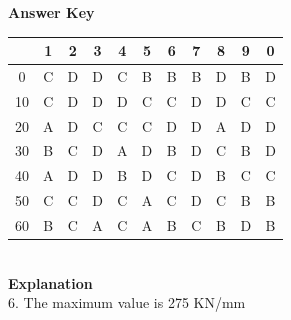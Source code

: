 \documentclass[11pt,a4paper]{article}
\begin{document}
\textbf{Answer Key}
\begin{tabular}{ | c | c c c c c c c c c c | }
\hline
 & 1 & 2 & 3 & 4 & 5 & 6 & 7 & 8 & 9 & 0 \\
\hline
0 & C & D & D & C & B & B & B & D & B & D \\
10 & C & D & D & D & C & C & D & D & C & C \\
20 & A & D & C & C & C & D & D & A & D & D \\
30 & B & C & D & A & D & B & D & C & B & D \\
40 & A & D & D & B & D & C & D & B & C & C \\
50 & C & C & D & C & A & C & D & C & B & B \\
60 & B & C & A & C & A & B & C & B & D & B \\
\hline
\end{tabular}
\\\textbf{Explanation}\\
6.
The maximum value is 275 KN/mm
\clearpage
\end{document}
